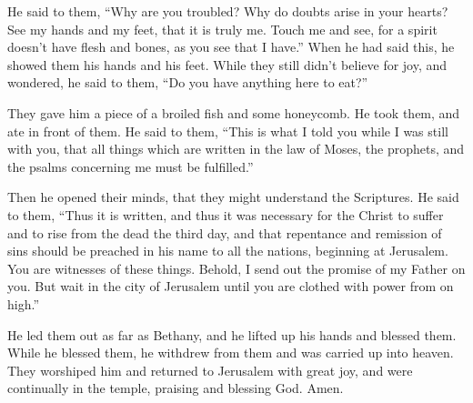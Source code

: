  He said to them, ``Why are you troubled? Why do doubts
arise in your hearts?  See my hands and my feet, that it
is truly me. Touch me and see, for a spirit doesn't have flesh and
bones, as you see that I have.''  When he had said this,
he showed them his hands and his feet.  While they still
didn't believe for joy, and wondered, he said to them, ``Do you have
anything here to eat?''

 They gave him a piece of a broiled fish and some
honeycomb.  He took them, and ate in front of them.
 He said to them, ``This is what I told you while I was
still with you, that all things which are written in the law of Moses,
the prophets, and the psalms concerning me must be fulfilled.''

 Then he opened their minds, that they might understand
the Scriptures.  He said to them, ``Thus it is written,
and thus it was necessary for the Christ to suffer and to rise from the
dead the third day,  and that repentance and remission of
sins should be preached in his name to all the nations, beginning at
Jerusalem.  You are witnesses of these things.
 Behold, I send out the promise of my Father on you. But
wait in the city of Jerusalem until you are clothed with power from on
high.''

 He led them out as far as Bethany, and he lifted up his
hands and blessed them.  While he blessed them, he
withdrew from them and was carried up into heaven.  They
worshiped him and returned to Jerusalem with great joy, 
and were continually in the temple, praising and blessing God. Amen.
